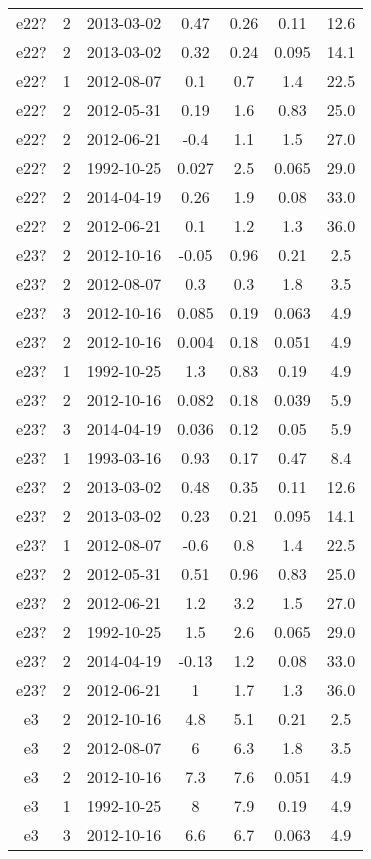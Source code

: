 \begin{table*}[htp]
\begin{tabular}{ccccccc}
e22? & 2 & 2013-03-02 & 0.47 & 0.26 & 0.11 & 12.6 \\
e22? & 2 & 2013-03-02 & 0.32 & 0.24 & 0.095 & 14.1 \\
e22? & 1 & 2012-08-07 & 0.1 & 0.7 & 1.4 & 22.5 \\
e22? & 2 & 2012-05-31 & 0.19 & 1.6 & 0.83 & 25.0 \\
e22? & 2 & 2012-06-21 & -0.4 & 1.1 & 1.5 & 27.0 \\
e22? & 2 & 1992-10-25 & 0.027 & 2.5 & 0.065 & 29.0 \\
e22? & 2 & 2014-04-19 & 0.26 & 1.9 & 0.08 & 33.0 \\
e22? & 2 & 2012-06-21 & 0.1 & 1.2 & 1.3 & 36.0 \\
e23? & 2 & 2012-10-16 & -0.05 & 0.96 & 0.21 & 2.5 \\
e23? & 2 & 2012-08-07 & 0.3 & 0.3 & 1.8 & 3.5 \\
e23? & 3 & 2012-10-16 & 0.085 & 0.19 & 0.063 & 4.9 \\
e23? & 2 & 2012-10-16 & 0.004 & 0.18 & 0.051 & 4.9 \\
e23? & 1 & 1992-10-25 & 1.3 & 0.83 & 0.19 & 4.9 \\
e23? & 2 & 2012-10-16 & 0.082 & 0.18 & 0.039 & 5.9 \\
e23? & 3 & 2014-04-19 & 0.036 & 0.12 & 0.05 & 5.9 \\
e23? & 1 & 1993-03-16 & 0.93 & 0.17 & 0.47 & 8.4 \\
e23? & 2 & 2013-03-02 & 0.48 & 0.35 & 0.11 & 12.6 \\
e23? & 2 & 2013-03-02 & 0.23 & 0.21 & 0.095 & 14.1 \\
e23? & 1 & 2012-08-07 & -0.6 & 0.8 & 1.4 & 22.5 \\
e23? & 2 & 2012-05-31 & 0.51 & 0.96 & 0.83 & 25.0 \\
e23? & 2 & 2012-06-21 & 1.2 & 3.2 & 1.5 & 27.0 \\
e23? & 2 & 1992-10-25 & 1.5 & 2.6 & 0.065 & 29.0 \\
e23? & 2 & 2014-04-19 & -0.13 & 1.2 & 0.08 & 33.0 \\
e23? & 2 & 2012-06-21 & 1 & 1.7 & 1.3 & 36.0 \\
e3 & 2 & 2012-10-16 & 4.8 & 5.1 & 0.21 & 2.5 \\
e3 & 2 & 2012-08-07 & 6 & 6.3 & 1.8 & 3.5 \\
e3 & 2 & 2012-10-16 & 7.3 & 7.6 & 0.051 & 4.9 \\
e3 & 1 & 1992-10-25 & 8 & 7.9 & 0.19 & 4.9 \\
e3 & 3 & 2012-10-16 & 6.6 & 6.7 & 0.063 & 4.9 \\

\end{tabular}
\end{table*}

